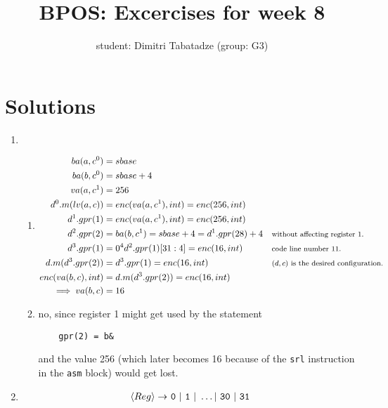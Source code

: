 \documentclass{article}
\title{BPOS: Excercises for week 8}
\author{student: Dimitri Tabatadze (group: G3)}
\begin{document}
    \maketitle
	\pagebreak

    \section*{Solutions}

    \begin{enumerate}
        \item {
			\begin{enumerate}
				\item {
					\begin{displaymath}
						\begin{aligned}
							ba(a, c^0) &= sbase \\
							ba(b, c^0) &= sbase + 4 \\
							va(a, c^1) &= 256 \\
							d^0.m(lv(a, c)) &= enc(va(a, c^1), int) = enc(256, int) \\
							d^1.gpr(1) &= enc(va(a, c^1), int) = enc(256, int) \\
							d^2.gpr(2) &= ba(b, c^1) = sbase + 4 = d^1.gpr(28) + 4 && \text{\footnotesize without affecting register 1.} \\
							d^3.gpr(1) &= 0^4d^2.gpr(1)[31:4] = enc(16, int) && \text{\footnotesize code line number 11.} \\
							d.m(d^3.gpr(2)) &= d^3.gpr(1) = enc(16, int) && \text{\footnotesize $(d, c)$ is the desired configuration.} \\
							enc(va(b, c), int) &= d.m(d^3.gpr(2)) = enc(16, int) \\
							\implies va(b, c) &= 16 
						\end{aligned}
					\end{displaymath}
				}
				\item {
					no, since register 1 might get used by the statement
					\begin{lstlisting}
	gpr(2) = b&
\end{lstlisting}
					and the value 256 (which later becomes 16 because of the \verb|srl| instruction in the \verb|asm| block) would get lost. 
				}
			\end{enumerate}
		}
        \item {
			\begin{displaymath}
				\begin{aligned}
					\langle Reg \rangle \rightarrow\ &  {\verb|0|\ |\ \verb|1|\ |\ \dots|\ \verb|30|\ |\ \verb|31|} \\

\end{aligned}
\end{displaymath}}
\end{enumerate}
\end{document}
